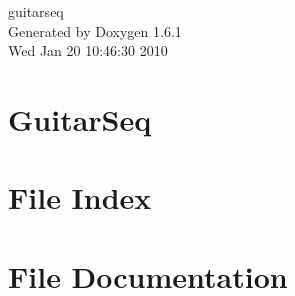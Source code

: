\documentclass[a4paper]{book}
\begin{document}
\hypersetup{pageanchor=false}
\begin{titlepage}
\vspace*{7cm}
\begin{center}
{\Large guitarseq }\\
\vspace*{1cm}
{\large Generated by Doxygen 1.6.1}\\
\vspace*{0.5cm}
{\small Wed Jan 20 10:46:30 2010}\\
\end{center}
\end{titlepage}
\clearemptydoublepage
{}
\tableofcontents
\clearemptydoublepage
{}
\hypersetup{pageanchor=true}
\chapter{GuitarSeq}
\label{index}\hypertarget{index}{}
\chapter{File Index}

\chapter{File Documentation}















\printindex
\end{document}
